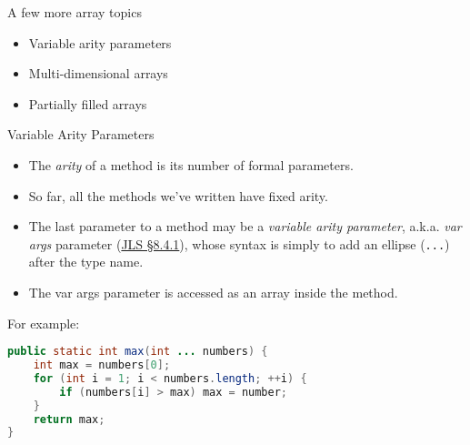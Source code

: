 \documentclass{beamer}
\begin{document}
\begin{frame}
  \titlepage
\end{frame}

\begin{frame}[fragile]{A few more array topics}


\begin{itemize}
\item Variable arity parameters
\item Multi-dimensional arrays
\item Partially filled arrays
\end{itemize}


\end{frame}

\begin{frame}[fragile]{Variable Arity Parameters}


\begin{itemize}
\item The {\it arity} of a method is its number of formal parameters.
\item So far, all the methods we've written have fixed arity.
\item The last parameter to a method may be a {\it variable arity parameter}, a.k.a. {\it var args} parameter (\href{http://docs.oracle.com/javase/specs/jls/se8/html/jls-8.html#jls-8.4.1}{JLS \S 8.4.1}), whose syntax is simply to add an ellipse ({\tt ...}) after the type name.
\item The var args parameter is accessed as an array inside the method.
\end{itemize}
For example:
\begin{lstlisting}[language=Java]
public static int max(int ... numbers) {
    int max = numbers[0];
    for (int i = 1; i < numbers.length; ++i) {
        if (numbers[i] > max) max = number;
    }
    return max;
}
\end{lstlisting}

\end{frame}
\end{document}
